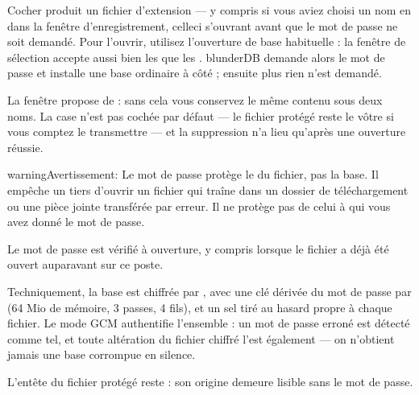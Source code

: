 \documentclass[letterpaper,10pt,french]{sphinxmanual}
\begin{document}
\sphinxAtStartPar
Cocher  produit un fichier
d’extension  — y compris si vous aviez choisi un nom en  dans la
fenêtre d’enregistrement, celle\sphinxhyphen{}ci s’ouvrant avant que le mot de passe ne soit
demandé. Pour l’ouvrir, utilisez l’ouverture de base habituelle : la fenêtre de
sélection accepte aussi bien les  que les . blunderDB demande
alors le mot de passe et installe une base ordinaire à côté ; ensuite plus rien
n’est demandé.

\sphinxAtStartPar
La fenêtre propose de  : sans
cela vous conservez le même contenu sous deux noms. La case n’est pas cochée par
défaut — le fichier protégé reste le vôtre si vous comptez le transmettre — et
la suppression n’a lieu qu’après une ouverture réussie.

\begin{sphinxadmonition}{warning}{Avertissement:}
\sphinxAtStartPar
Le mot de passe protège le  du fichier, pas la base. Il empêche
un tiers d’ouvrir un fichier qui traîne dans un dossier de téléchargement ou
une pièce jointe transférée par erreur. Il ne protège pas de celui à qui vous
avez donné le mot de passe.
\end{sphinxadmonition}

\sphinxAtStartPar
Le mot de passe est vérifié à  ouverture, y compris lorsque le fichier
a déjà été ouvert auparavant sur ce poste.

\sphinxAtStartPar
Techniquement, la base est chiffrée par , avec une clé
dérivée du mot de passe par  (64 Mio de mémoire, 3 passes, 4 fils),
et un sel tiré au hasard propre à chaque fichier. Le mode GCM authentifie
l’ensemble : un mot de passe erroné est détecté comme tel, et toute altération du
fichier chiffré l’est également — on n’obtient jamais une base corrompue en
silence.

\sphinxAtStartPar
L’en\sphinxhyphen{}tête du fichier protégé reste  : son origine demeure lisible
sans le mot de passe.
\end{document}
